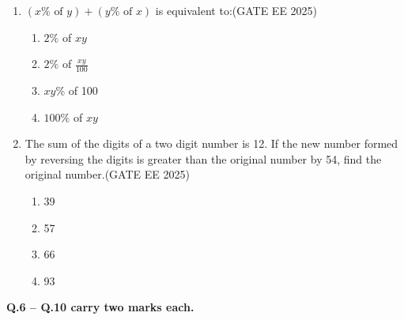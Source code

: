 \begin{enumerate}
\item $(x \% \text{ of } y) + (y \% \text{ of } x)$ is equivalent to:\hfill {(GATE EE 2025)}

\begin{multicols}{2}
\begin{enumerate}
\item $2 \%$ of $xy$
\item $2 \%$ of $\frac{xy}{100}$
\item $xy \%$ of 100
\item $100 \%$ of $xy$
\end{enumerate}
\end{multicols}



\item The sum of the digits of a two digit number is 12. If the new number formed by reversing the digits is greater than the original number by 54, find the original number.\hfill {(GATE EE 2025)}

\begin{multicols}{2}
\begin{enumerate}
\item 39
\item 57
\item 66
\item 93
\end{enumerate}

\end{multicols}

\end{enumerate}


\noindent \textbf{Q.6 -- Q.10 carry two marks each.}

